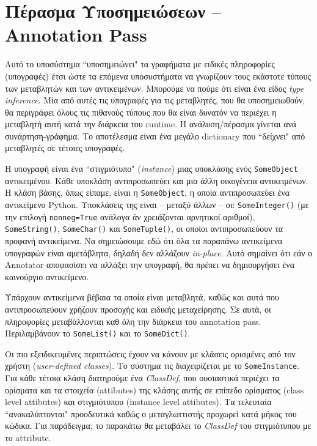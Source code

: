 \section{Πέρασμα Υποσημειώσεων – Annotation Pass}

Αυτό το υποσύστημα ``υποσημειώνει" τα γραφήματα με ειδικές πληροφορίες
(υπογραφές) έτσι ώστε τα επόμενα υποσυστήματα να γνωρίζουν τους εκάστοτε τύπους
των μεταβλητών και των αντικειμένων. Μπορούμε να πούμε ότι είναι ένα είδος
\textit{type inference}. Μία από αυτές τις υπογραφές για τις μεταβλητές, που θα
υποσημειωθούν, θα περιγράφει όλους τις πιθανούς τύπους που θα είναι δυνατόν να
περιέχει η μεταβλητή αυτή κατά την διάρκεια του runtime. Η ανάλυση/πέρασμα
γίνεται ανά συνάρτηση-γράφημα. Το αποτέλεσμα είναι ένα μεγάλο dictionary που
``δείχνει" από μεταβλητές σε τέτοιες υπογραφές.

Η υπογραφή είναι ένα ``στιγμιότυπο" (\textit{instance}) μιας υποκλάσης ενός
\texttt{SomeObject} αντικειμένου. Κάθε υποκλάση αντιπροσωπεύει και μια άλλη
οικογένεια αντικειμένων. Η κλάση βάσης, όπως είπαμε, είναι η
\texttt{SomeObject}, η οποία αντιπροσωπεύει ένα αντικείμενο Python. Υποκλάσεις
της είναι – μεταξύ άλλων – οι: \texttt{SomeInteger()} (με την επιλογή
\texttt{nonneg=True} ανάλογα άν χρειάζονται αρνητικοί αριθμοί), \\
\texttt{SomeString()}, \texttt{SomeChar()} και \texttt{SomeTuple()}, οι οποίοι
αντιπροσωπεύουν τα προφανή αντικείμενα. Να σημειώσουμε εδώ ότι όλα τα παραπάνω 
αντικείμενα υπογραφών είναι αμετάβλητα, δηλαδή δεν αλλάζουν \textit{in-place}. 
Αυτό σημαίνει ότι εάν ο Annotator αποφασίσει να αλλάξει την υπογραφή, θα 
πρέπει να δημιουργήσει ένα καινούργιο αντικείμενο.

Υπάρχουν αντικείμενα βέβαια τα οποία είναι μεταβλητά, καθώς και αυτά που
αντιπροσωπεύουν χρήζουν προσοχής και ειδικής μεταχείρησης. Σε αυτά, οι 
πληροφορίες μεταβάλλονται καθ όλη την διάρκεια του annotation pass.
Περιλαμβάνουν το \texttt{SomeList()} και το \texttt{SomeDict()}.

Οι πιο εξειδικευμένες περιπτώσεις έχουν να κάνουν με κλάσεις ορισμένες από τον
χρήστη (\textit{user-defined classes}). Το σύστημα τις διαχειρίζεται με το
\texttt{SomeInstance}. Για κάθε τέτοια κλάση διατηρούμε ένα \textit{ClassDef},
που ουσιαστικά περιέχει τα ορίσματα και τα στοιχεία (attibutes) της κλάσης αυτής
σε επίπεδο ορίσματος (class level attibutes) και στιγμιότυπου (instance level
attibutes). Τα τελευταία ``ανακαλύπτονται" προοδευτικά καθώς ο μεταγλωττιστής
προχωρεί κατά μήκος του κώδικα. Για παράδειγμα, το παρακάτω θα μεταβάλει το
\textit{ClassDef} του στιγμιότυπου με το attribute.


